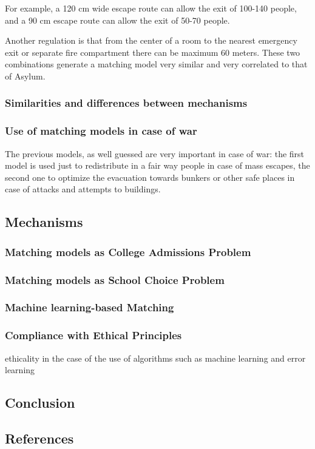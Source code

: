 \documentclass[letterpaper]{article} %
\begin{document}
For example, a 120 cm wide escape route can allow the exit of 100-140 people, and a 90 cm 
escape route can allow the exit of 50-70 people.

Another regulation is that from the center of a room to the nearest emergency exit or separate 
fire compartment there can be maximum 60 meters. These two combinations generate a matching model 
very similar and very correlated to that of Asylum.

\cite{delacretaz} 

\subsubsection{Similarities and differences between mechanisms}

\subsubsection{Use of matching models in case of war}

The previous models, as well guessed are very important in case of war: the first model is used just 
to redistribute in a fair way people in case of mass escapes, the second one to optimize the evacuation 
towards bunkers or other safe places in case of attacks and attempts to buildings.

\cite{delacretaz} 

\subsection{Mechanisms}

\subsubsection{Matching models as College Admissions Problem}

\cite{basshuysen} 

\subsubsection{Matching models as School Choice Problem}

\cite{basshuysen} 

\subsubsection{Machine learning-based Matching}

\cite{olbergml}

\subsubsection{Compliance with Ethical Principles}

\cite{basshuysen} 

ethicality in the case of the use of algorithms such as machine learning and error learning 

\subsection{Conclusion}

\subsection{References}



\end{document}
